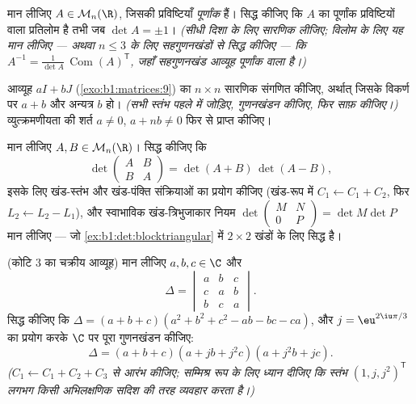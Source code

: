 \begin{exercise}[$\star\star$]\label{exo:b1:det:8}
मान लीजिए $A \in \mathcal{M}_n(\R)$, जिसकी प्रविष्टियाँ \emph{पूर्णांक} हैं।
सिद्ध कीजिए कि $A$ का पूर्णांक प्रविष्टियों वाला प्रतिलोम है तभी जब $\det A
= \pm 1$। \emph{(सीधी दिशा के लिए सारणिक लीजिए; विलोम के लिए यह मान लीजिए
--- अथवा $n \leq 3$ के लिए सहगुणनखंडों से सिद्ध कीजिए --- कि $A^{-1} =
\frac{1}{\det A}\,\operatorname{Com}(A)^{\mathsf T}$, जहाँ सहगुणनखंड आव्यूह
पूर्णांक वाला है।)}
\end{exercise}

\begin{exercise}[$\star\star\star$]\label{exo:b1:det:9}
आव्यूह $aI + bJ$ (\cref{exo:b1:matrices:9}) का $n \times n$ सारणिक संगणित
कीजिए, अर्थात् जिसके विकर्ण पर $a + b$ और अन्यत्र $b$ हो। \emph{(सभी स्तंभ
पहले में जोड़िए, गुणनखंडन कीजिए, फिर साफ़ कीजिए।)} व्युत्क्रमणीयता की शर्त
$a \neq 0$, $a + nb \neq 0$ फिर से प्राप्त कीजिए।
\end{exercise}

\begin{exercise}[$\star\star\star$]\label{exo:b1:det:10}
मान लीजिए $A, B \in \mathcal{M}_n(\R)$। सिद्ध कीजिए कि
\[
\det\begin{pmatrix} A & B\\ B & A \end{pmatrix}
= \det(A + B)\,\det(A - B),
\]
इसके लिए खंड-स्तंभ और खंड-पंक्ति संक्रियाओं का प्रयोग कीजिए (खंड-रूप में
$C_1 \leftarrow C_1 + C_2$, फिर $L_2 \leftarrow L_2 - L_1$), और स्वाभाविक
खंड-त्रिभुजाकार नियम $\det\begin{pmatrix} M & N\\ 0 & P\end{pmatrix} = \det
M \det P$ मान लीजिए --- जो \cref{ex:b1:det:blocktriangular} में $2 \times 2$
खंडों के लिए सिद्ध है।
\end{exercise}

\begin{exercise}[$\star\star$]\label{exo:b1:det:11}
(कोटि $3$ का चक्रीय आव्यूह) मान लीजिए $a, b, c \in \C$ और
\[
\Delta = \begin{vmatrix}
a & b & c\\
c & a & b\\
b & c & a
\end{vmatrix}.
\]
सिद्ध कीजिए कि $\Delta = (a + b + c)(a^2 + b^2 + c^2 - ab - bc - ca)$, और $j
= \eu^{2\iu\pi/3}$ का प्रयोग करके $\C$ पर पूरा गुणनखंडन कीजिए:
\[
\Delta = (a + b + c)(a + jb + j^2c)(a + j^2b + jc) .
\]
\emph{($C_1 \leftarrow C_1 + C_2 + C_3$ से आरंभ कीजिए; सम्मिश्र रूप के लिए
ध्यान दीजिए कि स्तंभ $(1, j, j^2)^{\mathsf T}$ लगभग किसी अभिलक्षणिक सदिश की
तरह व्यवहार करता है।)}
\end{exercise}


